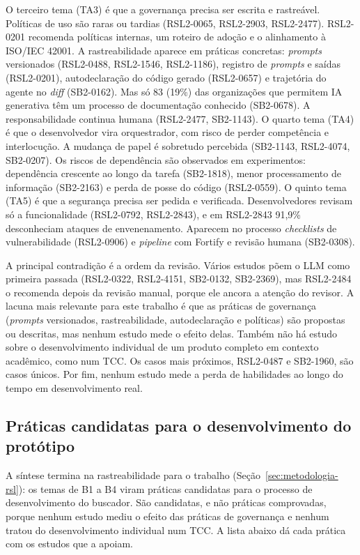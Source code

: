 O terceiro tema (TA3) é que a governança precisa ser escrita e rastreável.
Políticas de uso são raras ou tardias (RSL2-0065, RSL2-2903, RSL2-2477).
RSL2-0201 recomenda políticas internas, um roteiro de adoção e o alinhamento
à ISO/IEC 42001. A rastreabilidade aparece em práticas concretas:
\textit{prompts} versionados (RSL2-0488, RSL2-1546, RSL2-1186), registro de
\textit{prompts} e saídas (RSL2-0201), autodeclaração do código gerado
(RSL2-0657) e trajetória do agente no \textit{diff} (SB2-0162). Mas só 83
(19\%) das organizações que permitem IA generativa têm um processo de
documentação conhecido (SB2-0678). A responsabilidade continua humana
(RSL2-2477, SB2-1143). O quarto tema (TA4) é que o desenvolvedor vira
orquestrador, com risco de perder competência e interlocução. A mudança de
papel é sobretudo percebida (SB2-1143, RSL2-4074, SB2-0207). Os riscos de
dependência são observados em experimentos: dependência crescente ao longo
da tarefa (SB2-1818), menor processamento de informação (SB2-2163) e perda
de posse do código (RSL2-0559). O quinto tema (TA5) é que a segurança precisa
ser pedida e verificada. Desenvolvedores revisam só a funcionalidade
(RSL2-0792, RSL2-2843), e em RSL2-2843 91,9\% desconheciam ataques
de envenenamento. Aparecem no processo \textit{checklists} de
vulnerabilidade (RSL2-0906) e \textit{pipeline} com Fortify e revisão humana
(SB2-0308).

A principal contradição é a ordem da revisão. Vários estudos põem o LLM como
primeira passada (RSL2-0322, RSL2-4151, SB2-0132, SB2-2369), mas RSL2-2484 o
recomenda depois da revisão manual, porque ele ancora a atenção do revisor. A lacuna mais relevante
para este trabalho é que as práticas de governança (\textit{prompts}
versionados, rastreabilidade, autodeclaração e políticas) são propostas ou
descritas, mas nenhum estudo mede o efeito delas. Também não há estudo sobre
o desenvolvimento individual de um produto completo em contexto acadêmico,
como num TCC. Os casos mais próximos, RSL2-0487 e SB2-1960, são casos únicos.
Por fim, nenhum estudo mede a perda de habilidades ao longo do tempo em
desenvolvimento real.

\subsection{Práticas candidatas para o desenvolvimento do protótipo}
\label{sec:resultados-rsl2-praticas}

A síntese termina na rastreabilidade para o trabalho
(Seção~\ref{sec:metodologia-rsl}): os temas de B1 a B4 viram práticas
candidatas para o processo de desenvolvimento do buscador. São candidatas, e
não práticas comprovadas, porque nenhum estudo mediu o efeito das práticas de
governança e nenhum tratou do desenvolvimento individual num TCC. A lista
abaixo dá cada prática com os estudos que a apoiam.

